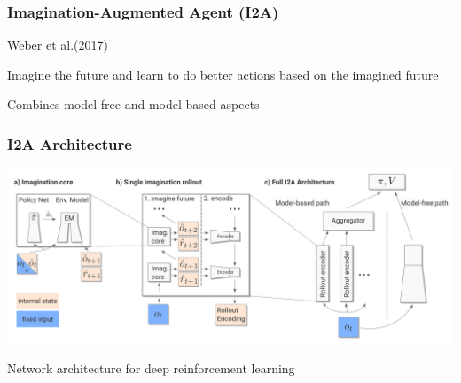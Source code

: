 


\PraesentationMasterWeissBlau 
\begin{frame} 

\end{frame} 

\PraesentationMasterStandard


\begin{frame}
    \frametitle{Imagination-Augmented Agent (I2A)}

\begin{PraesentationAufzaehlung}
	\item Weber et al.(2017)
    \item Imagine the future and learn to do better actions based on the imagined future
    \item Combines model-free and model-based aspects
\end{PraesentationAufzaehlung}

\end{frame}
\clearpage

\begin{frame}
    \frametitle{I2A Architecture}


\includegraphics[width=\columnwidth]{./Images/i2a_architecture.png}%
\begin{PraesentationAufzaehlung}
\item Network architecture for deep reinforcement learning
\end{PraesentationAufzaehlung}
    
\end{frame}
\clearpage

